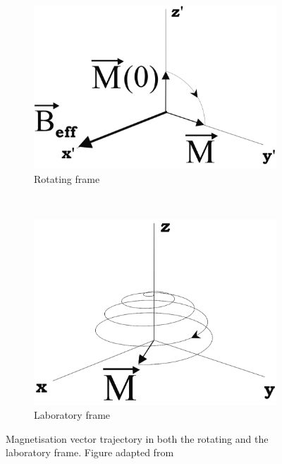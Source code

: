 \begin{figure}[ht]
    \centering
    \begin{subfigure}[b]{0.45\textwidth}
        \includegraphics[width=\textwidth]{images/mri/ch3spintraja}
        \caption{Rotating frame}
        \label{fig:ch3spintraja}
    \end{subfigure}
    ~ %
    \begin{subfigure}[b]{0.4\textwidth}
        \includegraphics[width=\textwidth]{images/mri/ch3spintrajb}
        \caption{Laboratory frame}
        \label{fig:ch3spintrajb}
    \end{subfigure}
    
    \caption{Magnetisation vector trajectory in both the rotating and the laboratory frame. Figure adapted from \cite{Haacke1999}}
    \label{fig:ch3spintrajboth}
\end{figure}


